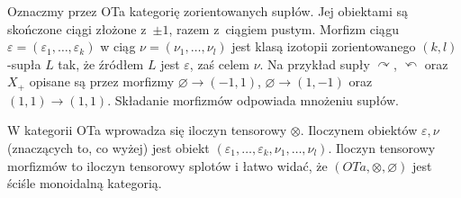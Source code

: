 \begin{proposition}
    Oznaczmy przez OTa kategorię zorientowanych supłów.
    Jej obiektami są skończone ciągi złożone z~$\pm 1$, razem z~ciągiem pustym.
    Morfizm ciągu $\varepsilon = (\varepsilon_1, \ldots, \varepsilon_k)$ w ciąg $\nu = (\nu_1, \ldots, \nu_l)$ jest klasą izotopii zorientowanego $(k, l)$-supła $L$ tak, że źródłem $L$ jest $\varepsilon$, zaś celem $\nu$.
    Na przykład supły $\curvearrowright$, $\curvearrowleft$ oraz $X_+$ opisane są przez morfizmy $\varnothing \to (-1, 1)$, $\varnothing \to (1, -1)$ oraz $(1, 1) \to (1, 1)$.
    Składanie morfizmów odpowiada mnożeniu supłów.

    W kategorii OTa wprowadza się iloczyn tensorowy $\otimes$. Iloczynem obiektów $\varepsilon, \nu$ (znaczących to, co wyżej) jest obiekt $(\varepsilon_1, \ldots, \varepsilon_k, \nu_1, \ldots, \nu_l)$.
    Iloczyn tensorowy morfizmów to iloczyn tensorowy splotów i łatwo widać, że $(OTa, \otimes, \varnothing)$ jest ściśle monoidalną kategorią.


\end{proposition}
